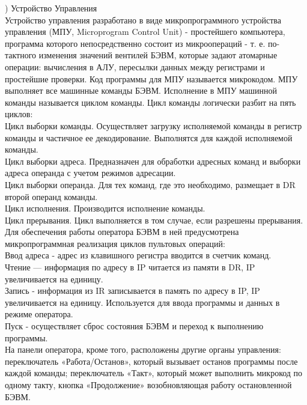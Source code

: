 ) Устройство Управления \\
Устройство управления разработано в виде микропрограммного устройства управления (МПУ, Microprogram Control Unit) - простейшего компьютера, программа которого непосредственно состоит из микроопераций - т. е. по-тактного изменения значений вентилей БЭВМ, которые задают атомарные операции: вычисления в АЛУ, пересылки данных между регистрами и простейшие проверки. Код программы для МПУ называется микрокодом.
МПУ выполняет все машинные команды БЭВМ. Исполнение в МПУ машинной команды называется циклом команды. Цикл команды логически разбит на пять циклов: \\
Цикл выборки команды. Осуществляет загрузку исполняемой команды в регистр команды и частичное ее декодирование. Выполнятся для каждой исполняемой команды. \\
Цикл выборки адреса. Предназначен для обработки адресных команд и выборки адреса операнда с учетом режимов адресации. \\
Цикл выборки операнда. Для тех команд, где это необходимо, размещает в DR второй операнд команды. \\
Цикл исполнения. Производится исполнение команды. \\
Цикл прерывания. Цикл выполняется в том случае, если разрешены прерывания. \\
Для обеспечения работы оператора БЭВМ в ней предусмотрена микропрограммная реализация циклов пультовых операций: \\
Ввод адреса - адрес из клавишного регистра вводится в счетчик команд. \\
Чтение — информация по адресу в IP читается из памяти в DR, IP увеличивается на единицу. \\
Запись -  информация из IR записывается в память по адресу в IP, IP увеличивается на единицу. Используется для ввода программы и данных в режиме оператора. \\
Пуск - осуществляет сброс состояния БЭВМ и переход к выполнению программы. \\
На панели оператора, кроме того, расположены другие органы управления: переключатель «Работа/Останов», который вызывает останов программы после каждой команды; переключатель «Такт», который может выполнить микрокод по одному такту, кнопка «Продолжение» возобновляющая работу остановленной БЭВМ.
